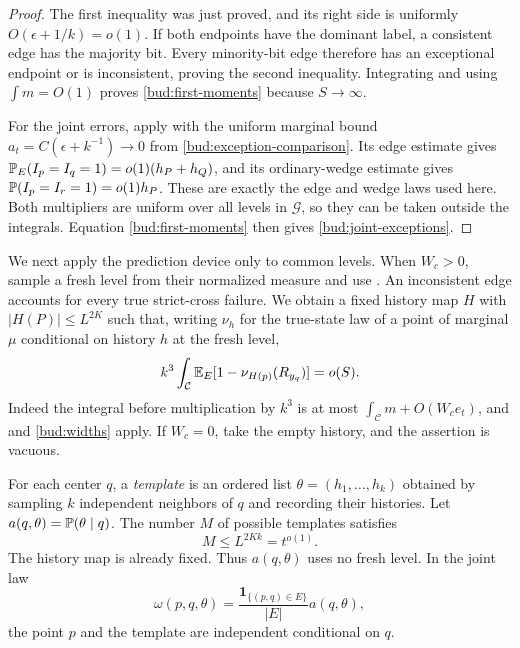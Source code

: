 \begin{proof}
The first inequality was just proved, and its right side is uniformly
$O(\epsilon+1/k)=o(1)$.  If both endpoints have the dominant label,
a consistent edge has the majority bit.  Every minority-bit edge
therefore has an exceptional endpoint or is inconsistent, proving the
second inequality.  Integrating and using $\int m=O(1)$ proves
\eqref{bud:first-moments} because $S\to\infty$.

For the joint errors, apply  with the uniform marginal
bound $a_t=C(\epsilon+k^{-1})\to0$ from
\eqref{bud:exception-comparison}.  Its edge estimate gives
$\mathbb P_E(I_p=I_q=1)=o(1)(h_P+h_Q)$, and its ordinary-wedge estimate
gives $\mathbb P(I_p=I_r=1)=o(1)h_P$.  These are exactly the edge and
wedge laws used here.  Both multipliers are uniform over all levels
in $\mathcal G$, so they can be taken outside the integrals.
Equation \eqref{bud:first-moments} then gives
\eqref{bud:joint-exceptions}.
\end{proof}

We next apply the prediction device only to common levels.  When
$W_c>0$, sample a fresh level from their normalized measure and use
.  An inconsistent edge accounts for every true
strict-cross failure.  We obtain a fixed history map $H$ with
$|H(P)|\le L^{2K}$ such that, writing $\nu_h$ for the true-state law
of a point of marginal $\mu$ conditional on history $h$ at the fresh
level,
\begin{equation}\label{bud:prediction-error}
 k^3\int_{\mathcal C}\mathbb E_E[1-\nu_{H(p)}(R_{y_q})]=o(S).
\end{equation}
Indeed the integral before multiplication by $k^3$ is at most
$\int_{\mathcal C}m+O(W_c e_t)$, and
 and \eqref{bud:widths} apply.  If $W_c=0$,
take the empty history, and the assertion is vacuous.

For each center $q$, a \emph{template} is an ordered list
$\theta=(h_1,\ldots,h_k)$ obtained by sampling $k$ independent
neighbors of $q$ and recording their histories.  Let
$a(q,\theta)=\mathbb P(\theta\mid q)$.  The number $M$ of possible
templates satisfies
\begin{equation}\label{bud:template-count}
 M\le L^{2Kk}=t^{o(1)}.
\end{equation}
The history map is already fixed.  Thus $a(q,\theta)$ uses no fresh
level.  In the joint law
\begin{equation}\label{bud:joint-law}
 \omega(p,q,\theta)=\frac{\mathbf1_{\{(p,q)\in E\}}}{|E|}
                         a(q,\theta),
\end{equation}
the point $p$ and the template are independent conditional on $q$.

